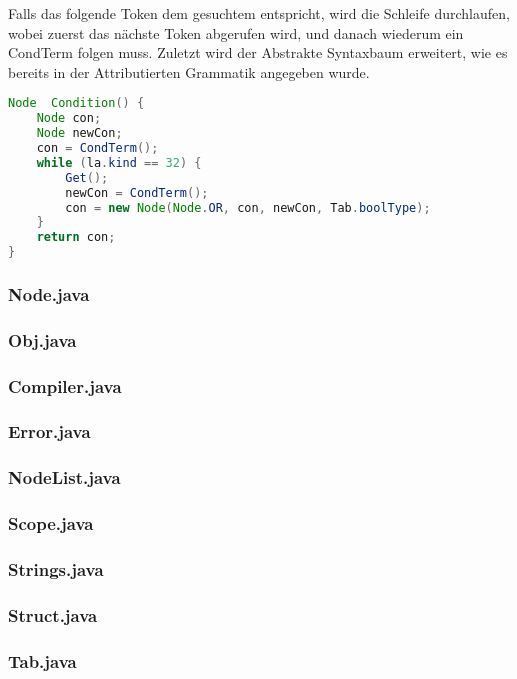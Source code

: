 Falls das folgende Token dem gesuchtem entspricht, wird die Schleife durchlaufen, wobei zuerst das n\"achste Token abgerufen wird, und danach wiederum ein CondTerm folgen muss. Zuletzt wird der Abstrakte Syntaxbaum erweitert, wie es bereits in der Attributierten Grammatik angegeben wurde.

\begin{lstlisting}[language=Java]
Node  Condition() {
	Node con;
	Node newCon; 
	con = CondTerm();
	while (la.kind == 32) {
		Get();
		newCon = CondTerm();
		con = new Node(Node.OR, con, newCon, Tab.boolType); 
	}
	return con;
}
\end{lstlisting}

\subsubsection{Node.java}

\subsubsection{Obj.java}

\subsubsection{Compiler.java}

\subsubsection{Error.java}

\subsubsection{NodeList.java}

\subsubsection{Scope.java}

\subsubsection{Strings.java}

\subsubsection{Struct.java}

\subsubsection{Tab.java}